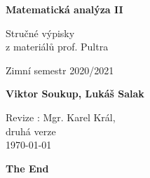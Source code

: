 \documentclass[11pt]{article}
\begin{document}
\begin{titlepage}
    \begin{center}
        \vspace*{1cm}
            
        \Huge
        \textbf{Matematická analýza II}
            
        \vspace{0.5cm}
        \LARGE
        Stručné výpisky
        \\

        z materiálů prof. Pultra

        \vspace{5mm}
        
        Zimní semestr 2020/2021
        
        \vspace{1.5cm}
            
        \textbf{Viktor Soukup, Lukáš Salak}
        
        \vfill
        \flushright
        \normalsize
        Revize : Mgr. Karel Král,\\
        druhá verze \\
        \today
        
    \end{center}
\end{titlepage}

\tableofcontents
\clearpage











\vfill
\begin{center}
\LARGE
\textbf{The End}
\end{center}
\end{document}

